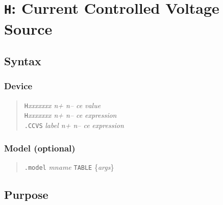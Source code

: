 %
%
%
%
\section{{\tt H}: Current Controlled Voltage Source}
\subsection{Syntax}
\subsubsection{Device}
\begin{verse}
{\tt H}{\it xxxxxxx n+ n-- ce} {\it value}\\
{\tt H}{\it xxxxxxx n+ n-- ce} {\it expression}\\
{\tt .CCVS} {\it label n+ n-- ce} {\it expression}
\end{verse}
\subsubsection{Model (optional)}
\begin{verse}
{\tt .model} {\it mname} {\tt TABLE} \{{\it args}\}
\end{verse}
\subsection{Purpose}

